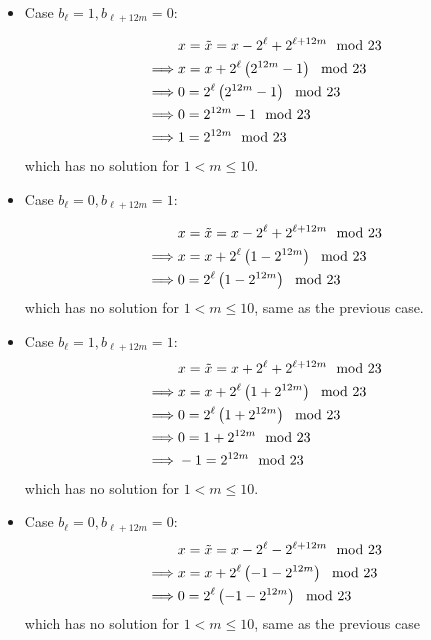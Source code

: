 \documentclass{article}
\begin{document}
\begin{itemize}
    \item Case $b_\ell = 1, b_{\ell + 12m} = 0$:
    
    \begin{align*}
        & x = \Tilde{x} = x - 2^\ell + 2^{\ell + 12m} \mod 23\\ 
        \implies & x = x + 2^\ell\left(2^{12m} - 1\right) \mod 23\\
        \implies & 0 = 2^\ell\left(2^{12m} - 1\right) \mod 23\\
        \implies & 0 = 2^{12m} - 1 \mod 23\\
        \implies & 1 = 2^{12m}  \mod 23
    \end{align*}
    which has no solution for $1 < m \leq 10$.
    
    \item Case $b_\ell = 0, b_{\ell + 12m} = 1$:
    
    \begin{align*}
        & x = \Tilde{x} = x - 2^\ell + 2^{\ell + 12m} \mod 23\\ 
        \implies & x =  x + 2^\ell\left(1 - 2^{12m}\right) \mod 23\\
        \implies & 0 = 2^\ell\left(1 - 2^{12m}\right) \mod 23\\
    \end{align*}
    which has no solution for $1 < m \leq 10$, same as the previous case.
    
    \item Case $b_\ell = 1, b_{\ell + 12m} = 1$:
        \begin{align*}
        & x = \Tilde{x} = x + 2^\ell + 2^{\ell + 12m} \mod 23 \\ 
        \implies & x = x + 2^\ell\left(1 + 2^{12m}\right) \mod 23\\
        \implies & 0 = 2^\ell\left(1 + 2^{12m}\right) \mod 23\\
        \implies & 0 = 1 + 2^{12m} \mod 23\\
        \implies & -1 = 2^{12m}  \mod 23
    \end{align*}
    which has no solution for $1 < m \leq 10$.
    
    \item Case $b_\ell = 0, b_{\ell + 12m} = 0$:
        \begin{align*}
        & x = \Tilde{x} = x - 2^\ell - 2^{\ell + 12m} \mod 23 \\ 
        \implies & x = x + 2^\ell\left(-1 - 2^{12m}\right) \mod 23\\
        \implies & 0 = 2^\ell\left(-1 - 2^{12m}\right) \mod 23\\
    \end{align*}
    which has no solution for $1 < m \leq 10$, same as the previous case
\end{itemize}
\end{document}
